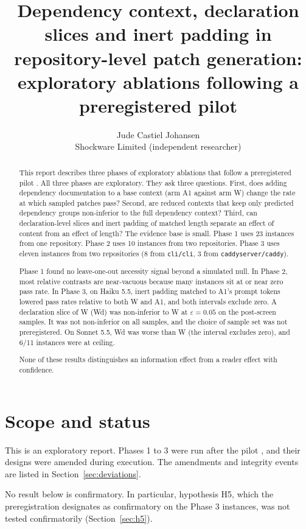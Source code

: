 \documentclass[11pt,a4paper]{article}
\title{Dependency context, declaration slices and inert padding in repository-level patch generation:\\ exploratory ablations following a preregistered pilot}
\author{Jude Castiel Johansen\\ Shockware Limited (independent researcher)}
\date{}
\newcommand{\eps}{\varepsilon}
\begin{document}
\maketitle

\begin{abstract}
This report describes three phases of exploratory ablations that follow a preregistered pilot \cite{pilot}. All three phases are exploratory. They ask three questions. First, does adding dependency documentation to a base context (arm A1 against arm W) change the rate at which sampled patches pass? Second, are reduced contexts that keep only predicted dependency groups non-inferior to the full dependency context? Third, can declaration-level slices and inert padding of matched length separate an effect of content from an effect of length? The evidence base is small. Phase 1 uses 23 instances from one repository. Phase 2 uses 10 instances from two repositories. Phase 3 uses eleven instances from two repositories (8 from \texttt{cli/cli}, 3 from \texttt{caddyserver/caddy}).

Phase 1 found no leave-one-out necessity signal beyond a simulated null. In Phase 2, most relative contrasts are near-vacuous because many instances sit at or near zero pass rate. In Phase 3, on Haiku 5.5, inert padding matched to A1's prompt tokens lowered pass rates relative to both W and A1, and both intervals exclude zero. A declaration slice of W (Wd) was non-inferior to W at $\eps = 0.05$ on the post-screen samples. It was not non-inferior on all samples, and the choice of sample set was not preregistered. On Sonnet 5.5, Wd was worse than W (the interval excludes zero), and 6/11 instances were at ceiling.

None of these results distinguishes an information effect from a reader effect with confidence.
\end{abstract}

\section{Scope and status}

This is an exploratory report. Phases 1 to 3 were run after the pilot \cite{pilot}, and their designs were amended during execution. The amendments and integrity events are listed in Section~\ref{sec:deviations}.

No result below is confirmatory. In particular, hypothesis H5, which the preregistration designates as confirmatory on the Phase 3 instances, was not tested confirmatorily (Section~\ref{sec:h5}).
\end{document}
